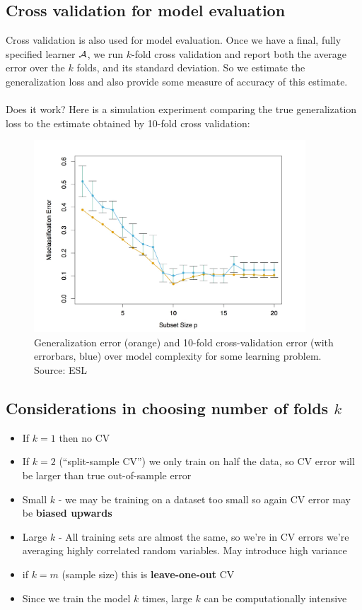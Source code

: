   \subsection{Cross validation for model evaluation}
  Cross validation is also used for model evaluation. Once we have a final,
  fully specified learner $\mathcal{A}$, we run $k$-fold cross validation and report
  both the average error over the $k$ folds, and its standard deviation. So we
  estimate the generalization loss and also provide some measure of accuracy
  of this estimate. 
\\~\\
Does it work? Here is a simulation experiment comparing the true generalization
loss to the estimate obtained by 10-fold cross validation:
\begin{figure}[H]
  \centering
        \includegraphics[width=4in]{cv_vs_test.jpeg}  
      \caption{
      Generalization error (orange) and 
      10-fold cross-validation error (with errorbars,
    blue) over model complexity for some learning problem. Source: ESL}
\end{figure}



    \subsection{Considerations in choosing number of folds $k$}
      \begin{itemize}
    \item If $k=1$ then no CV
\item If $k=2$ (``split-sample CV'') we only train on half the data, so CV error
  will be larger than true out-of-sample error
\item Small $k$ - we may be training on a dataset too small so again CV error
  may be {\bf biased upwards}
\item Large $k$ - All training sets are almost the same, so we're in CV errors
  we're averaging
  highly correlated random variables. May introduce high variance 
    \item if $k=m$ (sample size) this is {\bf leave-one-out} CV
    \item Since we train the model $k$ times, large $k$ can be computationally
      intensive
  \end{itemize}
 



